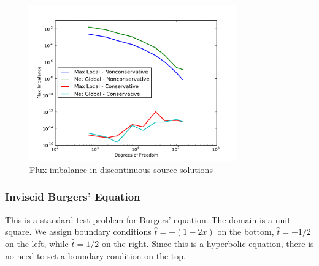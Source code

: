 \documentclass[Proposal.tex]{subfiles}
\begin{document}
\begin{figure}[p]
\centering
\includegraphics[width=0.8\textwidth]{figs/Discontinuous/modifiedFlux.pdf}
\caption{Flux imbalance in discontinuous source solutions}
\label{fig:discontinuous_flux}
\end{figure}

\subsubsection{Inviscid Burgers' Equation}\label{sec:inviscidBurgers}
This is a standard test problem for Burgers' equation. The domain is a unit
square. We assign boundary conditions $\hat t=-(1-2x)$ on the bottom, $\hat
t=-1/2$ on the left, while $\hat t=1/2$ on the right. Since this is a
hyperbolic equation, there is no need to set a boundary condition on the top.
\end{document}
